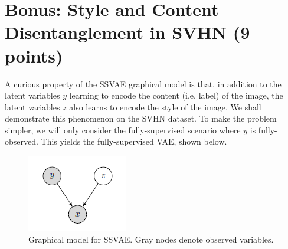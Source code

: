 \documentclass{article}
\theoremstyle{case}
\theoremstyle{definition}
\begin{document}
\section*{Bonus: Style and Content Disentanglement in SVHN (9 points)}

A curious property of the SSVAE graphical model is that, in addition to the latent variables \(y\) learning to encode the content (i.e. label) of the image, the latent variables \(z\) also learns to encode the style of the image. We shall demonstrate this phenomenon on the SVHN dataset. To make the problem simpler, we will only consider the fully-supervised scenario where \(y\) is fully-observed. This yields the fully-supervised VAE, shown below.

\begin{figure}[h]
    \centering
    \includegraphics[width=0.3\linewidth]{fig2.PNG}
    \caption{Graphical model for SSVAE. Gray nodes denote observed variables.}
    \label{fig:enter-label}
\end{figure}
\end{document}
